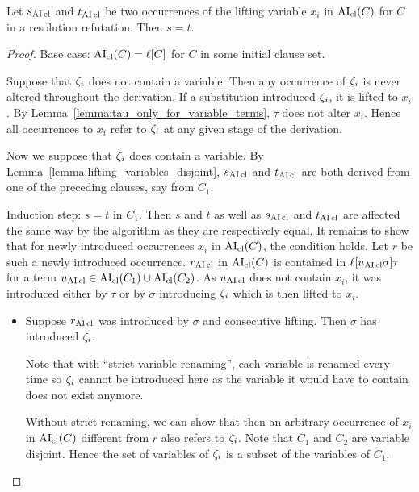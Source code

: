 \documentclass[,%
	paper=a4,%
	DIV12, %
	twoside=false,%
	liststotoc,
	bibtotoc,
	draft=false,%
	numbers=noendperiod
]{scrartcl}
\begin{document}
\begin{changebar}

\begin{lemma}
	\label{lemma:lifting_var_refers_to_same_terms}
	Let $s_{\operatorname{AI}\mathrm{cl}}$ and $t_{\operatorname{AI}\mathrm{cl}}$ be two occurrences of the lifting variable $x_i$ in $\operatorname{AI}_\mathrm{cl}(C)$ for $C$ in a resolution refutation.
	Then $s=t$.
\end{lemma}
\begin{proof}
	Base case: $\operatorname{AI}_\mathrm{cl}(C) = \ell[C]$ for $C$ in some initial clause set.

	Suppose that $\zeta_{i}$ does not contain a variable.
	Then any occurrence of $\zeta_{i}$ is never altered throughout the derivation.
	If a substitution introduced $\zeta_{i}$, it is lifted to $x_i$.
	By Lemma~\ref{lemma:tau_only_for_variable_terms}, $\tau$ does not alter $x_i$. 
	Hence all occurrences to $x_i$ refer to $\zeta_{i}$ at any given stage of the derivation.

	Now we suppose that $\zeta_{i}$ does contain a variable.
	By Lemma~\ref{lemma:lifting_variables_disjoint}, $s_{\operatorname{AI}\mathrm{cl}}$ and $t_{\operatorname{AI}\mathrm{cl}}$ are both derived from one of the preceding clauses, say from $C_1$. 

	Induction step: $s=t$ in $C_1$.
	Then $s$ and $t$ as well as $s_{\operatorname{AI}\mathrm{cl}}$ and $t_{\operatorname{AI}\mathrm{cl}}$ are affected the same way by the algorithm as they are respectively equal.
	It remains to show that for newly introduced occurrences $x_i$ in $\operatorname{AI}_\mathrm{cl}(C)$, the condition holds. Let $r$ be such a newly introduced occurrence.
	$r_{\operatorname{AI}\mathrm{cl}}$ in $\operatorname{AI}_\mathrm{cl}(C)$ is contained in $\ell[u_{\operatorname{AI}\mathrm{cl}}\sigma]\tau$ for a term $u_{\operatorname{AI}\mathrm{cl}} \in \operatorname{AI}_\mathrm{cl}(C_1) \cup \operatorname{AI}_\mathrm{cl}(C_2)$.
	As $u_{\operatorname{AI}\mathrm{cl}}$ does not contain $x_i$, it was introduced either by $\tau$ or by $\sigma$ introducing $\zeta_{i}$ which is then lifted to $x_i$.
	\begin{itemize}
		\item Suppose $r_{\operatorname{AI}\mathrm{cl}}$ was introduced by $\sigma$ and consecutive lifting. 
			Then $\sigma$ has introduced $\zeta_{i}$.

			\mytodo{} Note that with ``strict variable renaming'', each variable is renamed every time so $\zeta_{i}$ cannot be introduced here as the variable it would have to contain does not exist anymore.

			Without strict renaming, we can show that then an arbitrary occurrence of $x_i$ in $\operatorname{AI}_\mathrm{cl}(C)$ different from $r$ also refers to $\zeta_{i}$.
			Note that $C_1$ and $C_2$ are variable disjoint.
			Hence the set of variables of $\zeta_{i}$ is a subset of the variables of $C_1$. 


\end{itemize}
\end{proof}
\end{changebar}
\end{document}

